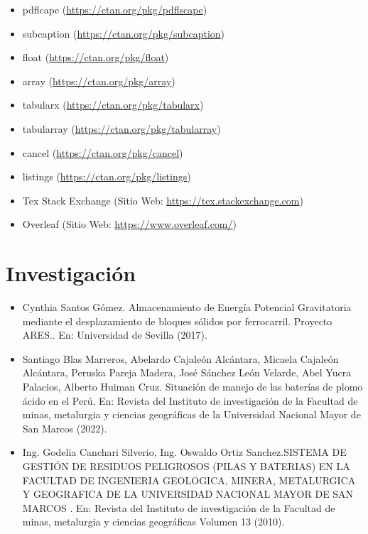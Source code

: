 \begin{itemize} [label=•]
                \item pdflcape (\href{https://ctan.org/pkg/pdflscape}{https://ctan.org/pkg/pdflscape})
                \item subcaption (\href{https://ctan.org/pkg/subcaption}{https://ctan.org/pkg/subcaption})
                \item float (\href{https://ctan.org/pkg/float}{https://ctan.org/pkg/float})
                \item array (\href{https://ctan.org/pkg/array}{https://ctan.org/pkg/array})
                \item tabularx (\href{https://ctan.org/pkg/tabularx}{https://ctan.org/pkg/tabularx})
                \item tabularray (\href{https://ctan.org/pkg/tabularray}{https://ctan.org/pkg/tabularray})
                \item cancel (\href{https://ctan.org/pkg/cancel}{https://ctan.org/pkg/cancel})
                \item listings (\href{https://ctan.org/pkg/listings}{https://ctan.org/pkg/listings})
                \item Tex Stack Exchange (Sitio Web: \href{https://tex.stackexchange.com}{https://tex.stackexchange.com})
                \item Overleaf (Sitio Web: \href{https://www.overleaf.com/}{https://www.overleaf.com/})
            \end{itemize}
            
        \section{Investigación}
            \begin{itemize} [label=•]
                \setlength{\itemindent}{3em}
                \item Cynthia Santos Gómez. \guillemotleft Almacenamiento de Energía Potencial Gravitatoria mediante el desplazamiento de bloques sólidos por ferrocarril. Proyecto ARES.\guillemotright. En: Universidad de Sevilla (2017).
                \item Santiago Blas Marreros, Abelardo Cajaleón Alcántara, Micaela Cajaleón Alcántara, Peruska Pareja Madera, José Sánchez León Velarde, Abel Yucra Palacios, Alberto Huiman Cruz. \guillemotleft Situación de manejo de las baterías de plomo ácido en el Perú\guillemotright. En: Revista del Instituto de investigación de la Facultad de minas, metalurgia y ciencias geográficas de la Universidad Nacional Mayor de San Marcos (2022).
                \item Ing. Godelia Canchari Silverio, Ing. Oswaldo Ortiz Sanchez.\guillemotleft SISTEMA DE GESTIÓN DE RESIDUOS PELIGROSOS (PILAS Y BATERIAS) EN LA FACULTAD DE INGENIERIA GEOLOGICA, MINERA, METALURGICA Y GEOGRAFICA DE LA UNIVERSIDAD NACIONAL MAYOR DE SAN MARCOS \guillemotright. En: Revista del Instituto de investigación de la Facultad de minas, metalurgia y ciencias geográficas Volumen 13 (2010).
            \end{itemize}